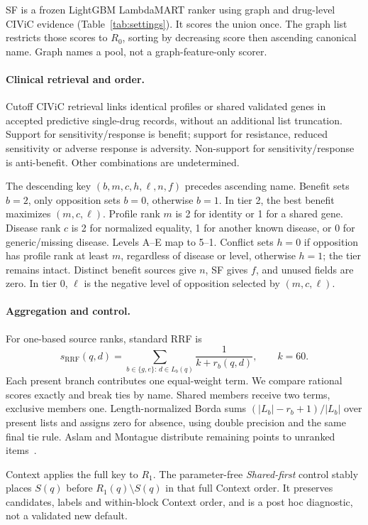 SF is a frozen LightGBM LambdaMART ranker using graph and drug-level CIViC evidence (Table~\ref{tab:settings}). It scores the union once. The graph list restricts those scores to $R_0$, sorting by decreasing score then ascending canonical name. Graph names a pool, not a graph-feature-only scorer.

\paragraph{Clinical retrieval and order.}
Cutoff CIViC retrieval links identical profiles or shared validated genes in accepted predictive single-drug records, without an additional list truncation. Support for sensitivity/response is benefit; support for resistance, reduced sensitivity or adverse response is adversity. Non-support for sensitivity/response is anti-benefit. Other combinations are undetermined.

The descending key $(b,m,c,h,\ell,n,f)$ precedes ascending name. Benefit sets $b=2$, only opposition sets $b=0$, otherwise $b=1$. In tier 2, the best benefit maximizes $(m,c,\ell)$. Profile rank $m$ is 2 for identity or 1 for a shared gene. Disease rank $c$ is 2 for normalized equality, 1 for another known disease, or 0 for generic/missing disease. Levels A--E map to 5--1. Conflict sets $h=0$ if opposition has profile rank at least $m$, regardless of disease or level, otherwise $h=1$; the tier remains intact. Distinct benefit sources give $n$, SF gives $f$, and unused fields are zero. In tier 0, $\ell$ is the negative level of opposition selected by $(m,c,\ell)$.

\paragraph{Aggregation and control.}
For one-based source ranks, standard RRF is
\begin{equation}
s_{\mathrm{RRF}}(q,d)=\sum_{b\in\{g,e\}:\,d\in L_b(q)}\frac{1}{k+r_b(q,d)},\qquad k=60.
\label{eq:rrf}
\end{equation}
Each present branch contributes one equal-weight term. We compare rational scores exactly and break ties by name. Shared members receive two terms, exclusive members one. Length-normalized Borda sums $(|L_b|-r_b+1)/|L_b|$ over present lists and assigns zero for absence, using double precision and the same final tie rule. Aslam and Montague distribute remaining points to unranked items~\cite{metasearch}.

Context applies the full key to $R_1$. The parameter-free \emph{Shared-first} control stably places $S(q)$ before $R_1(q)\setminus S(q)$ in that full Context order. It preserves candidates, labels and within-block Context order, and is a post hoc diagnostic, not a validated new default.

